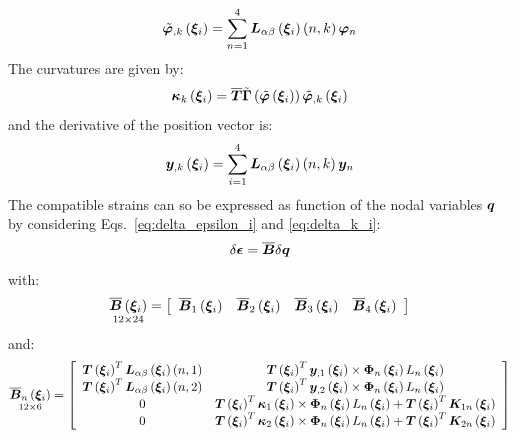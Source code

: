 \begin{equation}
\tilde{ \T{ \varphi } }_{,k} \valxii  =
\sum_{n=1}^4 \TT{L}_{\alpha \beta} \valxii \plbr{ n, k } \T{\varphi}_{n}
\end{equation}
The curvatures are given by:
\begin{equation}
\T{\kappa}_k \valxii  =
\overline{\TT{T}} \tilde{\TT{\Gamma}} \plbr{ \tilde{\T{\varphi}} \valxii } \tilde{ \T{\varphi} }_{,k} \valxii
\end{equation}
and the derivative of the position vector is:
\begin{equation}
\T{y}_{,k} \valxii  =
\sum_{i=1}^{4} \TT{L}_{\alpha \beta} \valxii \plbr{n,k} \T{y}_n
\end{equation}
The compatible strains can so be expressed as function of the nodal variables $\T{q}$ by considering Eqs.~\ref{eq:delta_epsilon_i} and \ref{eq:delta_k_i}:
\begin{equation}
\delta \T{\epsilon} = \overline{\TT{B}} \delta{\T{q}}
\end{equation}
with:
\begin{equation}
\underset{ 12 \times 24 }{\overline{\TT{B}} \valxii} =
\sqbr{ \matr{ c c c c  }{
\overline{\TT{B}}_1 \valxii & \overline{\TT{B}}_2 \valxii & \overline{\TT{B}}_3 \valxii & \overline{\TT{B}}_4 \valxii
}}
\label{eq:B_overline}
\end{equation}
and:
\begin{equation}
\underset{ 12 \times 6 }{\overline{\TT{B}}_n \valxii} =
\sqbr{ \matr{ c c  }{
\TT{T} \valxii^T \TT{L}_{\alpha \beta} \valxii \plbr{n,1} & \TT{T}\valxii^T \T{y}_{,1} \valxii \times \TT{\Phi}_{n} \valxii L_{n} \valxii \\
\TT{T} \valxii^T \TT{L}_{\alpha \beta} \valxii \plbr{n,2} & \TT{T}\valxii^T \T{y}_{,2} \valxii \times \TT{\Phi}_{n} \valxii L_{n} \valxii \\
0 & \TT{T}\valxii^T \T{\kappa}_{1} \valxii \times \TT{\Phi}_{n} \valxii L_{n} \valxii + \TT{T} \valxii^T \TT{K}_{1n} \valxii \\
0 & \TT{T}\valxii^T \T{\kappa}_{2} \valxii \times \TT{\Phi}_{n} \valxii L_{n} \valxii + \TT{T} \valxii^T \TT{K}_{2n} \valxii
}}
\end{equation}
